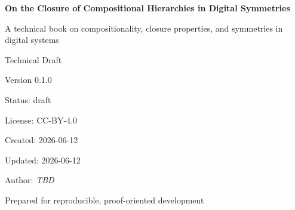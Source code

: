 \begin{titlepage}
\centering
\vspace*{1.25in}

{\Huge\bfseries On the Closure of Compositional Hierarchies in Digital Symmetries\par}
\vspace{0.35in}
{\Large A technical book on compositionality, closure properties, and symmetries in digital systems\par}
\vspace{0.85in}

{\large Technical Draft\par}
\vspace{0.25in}
{\large Version 0.1.0\par}
\vspace{0.25in}
{\large Status: draft\par}
\vspace{0.25in}
{\large License: CC-BY-4.0\par}
\vspace{0.25in}
{\large Created: 2026-06-12\par}
\vspace{0.25in}
{\large Updated: 2026-06-12\par}
\vspace{0.25in}
{\large Author: \textit{TBD}\par}

\vfill

{\large Prepared for reproducible, proof-oriented development\par}
\end{titlepage}

\cleardoublepage

